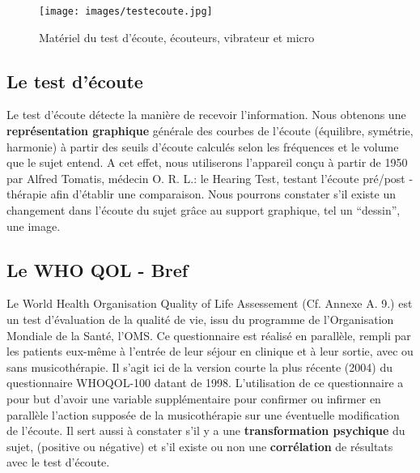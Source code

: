 \begin{figure}
	\centering
	\texttt{[image: images/testecoute.jpg]}
	\caption[Appareil test écoute]{Matériel du test d'écoute, écouteurs, vibrateur et micro}
	
	\label{appareiltestecoute}
\end{figure}

\subsection {Le test d'écoute}
Le test d'écoute détecte la manière de recevoir
l'information.
Nous obtenons une
\textbf{représentation graphique} générale des courbes de l'écoute
(équilibre, symétrie, harmonie) à partir des seuils d'écoute
calculés selon les fréquences et le volume que le sujet entend.
A cet effet, nous utiliserons l'appareil conçu à partir de 1950 par Alfred Tomatis, médecin
O. R. L.: le Hearing Test, testant
l'écoute pré/post - thérapie
afin d'établir une comparaison.
Nous pourrons constater
s'il existe un changement dans l'écoute du sujet grâce au support graphique, tel un ``dessin'',
une image. %

\subsection {Le WHO QOL  - Bref}  
Le World Health 	Organisation Quality of Life Assessement  (Cf. Annexe A. 9.) 
est un test d'évaluation de la qualité de vie, issu du
programme de l'Organisation Mondiale de la Santé, l'OMS.
Ce questionnaire est réalisé en parallèle, rempli par
les patients eux-même à l'entrée de leur séjour en clinique et
à leur sortie, avec ou sans musicothérapie.
Il s'agit ici de la version courte  la plus récente (2004) du questionnaire
WHOQOL-100 datant de 1998.
L'utilisation de ce questionnaire a pour but d'avoir
une variable supplémentaire pour confirmer ou infirmer en
parallèle l'action supposée  de la musicothérapie sur une éventuelle
modification de l'écoute.
Il sert aussi à constater s'il y a une\textbf{ transformation psychique }du sujet,
(positive ou négative) et s'il existe ou non une \textbf{corrélation }de
résultats avec le test d'écoute.



